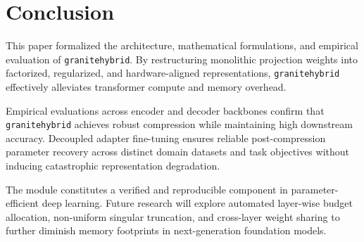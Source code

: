 \section{Conclusion}
This paper formalized the architecture, mathematical formulations, and empirical evaluation of \texttt{granitehybrid}. By restructuring monolithic projection weights into factorized, regularized, and hardware-aligned representations, \texttt{granitehybrid} effectively alleviates transformer compute and memory overhead.

Empirical evaluations across encoder and decoder backbones confirm that \texttt{granitehybrid} achieves robust compression while maintaining high downstream accuracy. Decoupled adapter fine-tuning ensures reliable post-compression parameter recovery across distinct domain datasets and task objectives without inducing catastrophic representation degradation.

The module constitutes a verified and reproducible component in parameter-efficient deep learning. Future research will explore automated layer-wise budget allocation, non-uniform singular truncation, and cross-layer weight sharing to further diminish memory footprints in next-generation foundation models.
